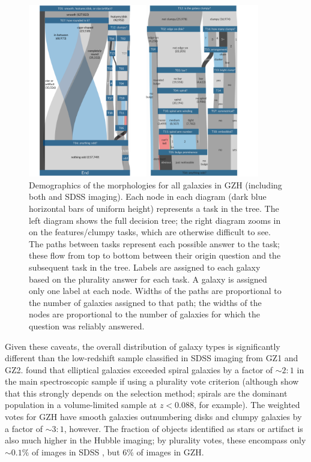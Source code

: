 \documentclass[twocolumn]{aastex6}
\begin{document}
\begin{figure}
\center
\includegraphics[width=0.90\textwidth]{figures/sankey_both.png}
\caption{Demographics of the morphologies for all galaxies in GZH (including
both \hst{} and SDSS imaging). Each node in each diagram (dark blue horizontal
bars of uniform height) represents a task in the tree. The left diagram shows
the full decision tree; the right diagram zooms in on the features/clumpy
tasks, which are otherwise difficult to see. The paths between tasks represent
each possible answer to the task; these flow from top to bottom between their
origin question and the subsequent task in the tree. Labels are assigned to
each galaxy based on the plurality answer for each task. A galaxy is assigned
only one label at each node. Widths of the paths are proportional to the number
of galaxies assigned to that path; the widths of the nodes are proportional to
the number of galaxies for which the question was reliably answered.}
\label{fig:sankey}
\end{figure}

Given these caveats, the overall distribution of galaxy types is significantly
different than the low-redshift sample classified in SDSS imaging from GZ1 and
GZ2. \citet{lin11} found that elliptical galaxies exceeded spiral galaxies by a
factor of $\sim2:1$ in the main spectroscopic sample if using a plurality vote
criterion (although \citealt{bam09} show that this strongly depends on the
selection method; spirals are the dominant population in a volume-limited
sample at $z<0.088$, for example). The weighted votes for GZH have smooth
galaxies outnumbering disks and clumpy galaxies by a factor of $\sim3:1$,
however. The fraction of objects identified as stars or artifact is also much
higher in the Hubble imaging; by plurality votes, these encompass only
$\sim0.1\%$ of images in SDSS \citep{wil13}, but 6\% of images in GZH. 
\end{document}
